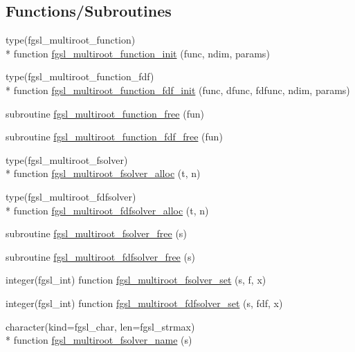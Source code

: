 \subsection*{Functions/\-Subroutines}
\begin{DoxyCompactItemize}
\item 
type(fgsl\-\_\-multiroot\-\_\-function) \\*
function \hyperlink{multiroots_8finc_a78b20b390717ee23f7939615cbe93ff5}{fgsl\-\_\-multiroot\-\_\-function\-\_\-init} (func, ndim, params)
\item 
type(fgsl\-\_\-multiroot\-\_\-function\-\_\-fdf) \\*
function \hyperlink{multiroots_8finc_aa6562b8729129576adc2644344af1d82}{fgsl\-\_\-multiroot\-\_\-function\-\_\-fdf\-\_\-init} (func, dfunc, fdfunc, ndim, params)
\item 
subroutine \hyperlink{multiroots_8finc_a9b0beb12d58e735ed7597de7271439fc}{fgsl\-\_\-multiroot\-\_\-function\-\_\-free} (fun)
\item 
subroutine \hyperlink{multiroots_8finc_ab1e9265827f89cd911c898df0eb8657d}{fgsl\-\_\-multiroot\-\_\-function\-\_\-fdf\-\_\-free} (fun)
\item 
type(fgsl\-\_\-multiroot\-\_\-fsolver) \\*
function \hyperlink{multiroots_8finc_a9967caceee0113037f46962e830a3d7d}{fgsl\-\_\-multiroot\-\_\-fsolver\-\_\-alloc} (t, n)
\item 
type(fgsl\-\_\-multiroot\-\_\-fdfsolver) \\*
function \hyperlink{multiroots_8finc_ab89adde0a73d47f7bcc272997b3f6c8d}{fgsl\-\_\-multiroot\-\_\-fdfsolver\-\_\-alloc} (t, n)
\item 
subroutine \hyperlink{multiroots_8finc_a062ba1ccc85350d3089b310296166e7c}{fgsl\-\_\-multiroot\-\_\-fsolver\-\_\-free} (s)
\item 
subroutine \hyperlink{multiroots_8finc_aee27003f4d58d412ebbde4d72eace13e}{fgsl\-\_\-multiroot\-\_\-fdfsolver\-\_\-free} (s)
\item 
integer(fgsl\-\_\-int) function \hyperlink{multiroots_8finc_a85ec239778cc40c12c0cdda378b3f704}{fgsl\-\_\-multiroot\-\_\-fsolver\-\_\-set} (s, f, x)
\item 
integer(fgsl\-\_\-int) function \hyperlink{multiroots_8finc_a11f98af2f96332f471fa4cdcce719b0a}{fgsl\-\_\-multiroot\-\_\-fdfsolver\-\_\-set} (s, fdf, x)
\item 
character(kind=fgsl\-\_\-char, len=fgsl\-\_\-strmax) \\*
function \hyperlink{multiroots_8finc_aa0ce2f798740b7d41bed54676c414514}{fgsl\-\_\-multiroot\-\_\-fsolver\-\_\-name} (s)

\end{DoxyCompactItemize}
